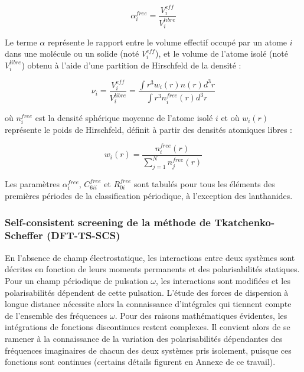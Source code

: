 \documentclass[12pt,a4paper]{book}
\begin{document}
{	\begin{equation}
	\alpha_{i}^{free} = \frac{V_{i}^{eff}}{V_{i}^{libre}}
	\end{equation}
	
	Le terme $\alpha$ représente le rapport entre le volume effectif occupé par un atome $i$ dans une molécule ou un solide (noté $V_{i}^{eff}$), et le volume de l’atome isolé (noté $V_{i}^{libre}$) obtenu à l’aide d’une partition de Hirschfeld de la densité :
	
	\begin{equation}
	\nu_{i} = \frac{V_{i}^{eff}}{V_{i}^{libre}} = \frac{\int r^{3} w_{i}(r)n(r)d^{3}r}{\int r^{3} n_{i}^{free} (r)d^{3}r}
	\end{equation}
	
	où $n_{i}^{free}$ est la densité sphérique moyenne de l’atome isolé $i$ et où $w_{i}(r)$ représente le poids de Hirschfeld, définit à partir des densités atomiques libres : 
	
	\begin{equation}
	w_{i}(r)= \frac{n_{i}^{free}(r)}{\sum_{j=1}^{N} n_{j}^{free}(r)}
	\end{equation}
	\bigskip
	
	Les paramètres $\alpha_{i}^{free}$, $C_{6ii}^{free}$ et $R_{0i}^{free}$ sont tabulés pour tous les éléments des premières périodes de la classification périodique, à l'exception des lanthanides.
	
	
	\subsubsection{Self-consistent screening de la méthode de Tkatchenko-Scheffer (DFT-TS-SCS)}
	
	En l'absence de champ électrostatique, les interactions entre deux systèmes sont décrites en fonction de leurs moments permanents et des polarisabilités statiques. Pour un champ périodique de pulsation $\omega$, les interactions sont modifiées et les polarisabilités dépendent de cette pulsation. L'étude des forces de dispersion à longue distance nécessite alors la connaissance d'intégrales qui tiennent compte de l'ensemble des fréquences $\omega$. Pour des raisons mathématiques évidentes, les intégrations de fonctions discontinues restent complexes. Il convient alors de se ramener à la connaissance de la variation des polarisabilités dépendantes des fréquences imaginaires de chacun des deux systèmes pris isolement, puisque ces fonctions sont continues (certains détails figurent en Annexe de ce travail). \\
	
}
\end{document}
